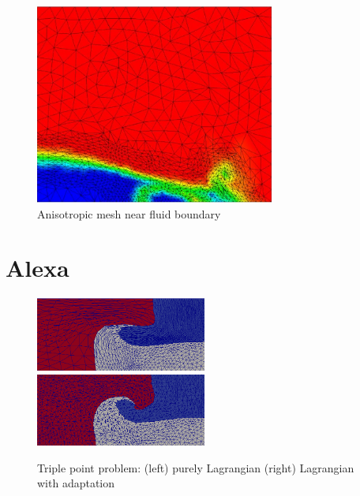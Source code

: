 \begin{figure}
\begin{center}
\includegraphics[width=0.7\textwidth]{proteus_aniso.png}
\caption{Anisotropic mesh near fluid boundary}
\label{fig:proteus_aniso}
\end{center}
\end{figure}

\section{Alexa}
\label{sec:alexa}

\begin{figure}[t]\vspace*{4pt}
\centerline{
\includegraphics[width=0.5\textwidth]{tpp_noadapt.png}
\includegraphics[width=0.5\textwidth]{tpp_adapt.png}}
\caption{Triple point problem: (left) purely Lagrangian
(right) Lagrangian with adaptation}\vspace*{-6pt}
\label{fig:tpp}
\end{figure}

